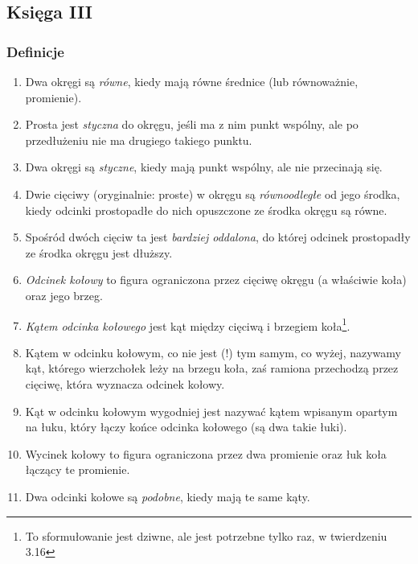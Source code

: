 %


\subsection{Księga III}
\subsubsection{Definicje}
\begin{enumerate}
    \item [3.1] Dwa okręgi są \emph{równe}, kiedy mają równe średnice (lub równoważnie, promienie).
    \item [3.2] Prosta jest \emph{styczna} do okręgu, jeśli ma z nim punkt wspólny, ale po przedłużeniu nie ma drugiego takiego punktu.
    \item [3.3] Dwa okręgi są \emph{styczne}, kiedy mają punkt wspólny, ale nie przecinają się.
    \item [3.4] Dwie cięciwy (oryginalnie: proste) w okręgu są \emph{równoodległe} od jego środka, kiedy odcinki prostopadłe do nich opuszczone ze środka okręgu są równe.
    \item [3.5] Spośród dwóch cięciw ta jest \emph{bardziej oddalona}, do której odcinek prostopadły ze środka okręgu jest dłuższy.
    \item [3.6] \emph{Odcinek kołowy} to figura ograniczona przez cięciwę okręgu (a właściwie koła) oraz jego brzeg.
    \item [3.7] \emph{Kątem odcinka kołowego} jest kąt między cięciwą i brzegiem koła\footnote{To sformułowanie jest dziwne, ale jest potrzebne tylko raz, w twierdzeniu 3.16}.
    \item [3.8] Kątem w odcinku kołowym, co nie jest (!) tym samym, co wyżej, nazywamy kąt, którego wierzchołek leży na brzegu koła, zaś ramiona przechodzą przez cięciwę, która wyznacza odcinek kołowy.
    \item [3.9] Kąt w odcinku kołowym wygodniej jest nazywać kątem wpisanym opartym na łuku, który łączy końce odcinka kołowego (są dwa takie łuki).
    \item [3.10] Wycinek kołowy to figura ograniczona przez dwa promienie oraz łuk koła łączący te promienie.
    \item [3.11] Dwa odcinki kołowe są \emph{podobne}, kiedy mają te same kąty.
\end{enumerate}

